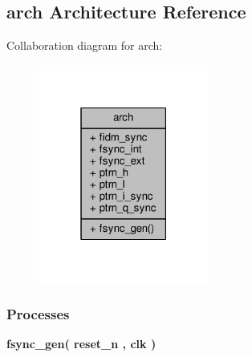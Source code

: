 \subsection{arch Architecture Reference}
\label{classtxiq__tst__ptrn_1_1arch}


Collaboration diagram for arch\+:\nopagebreak
\begin{figure}[H]
\begin{center}
\leavevmode
\includegraphics[width=159pt]{d0/da1/classtxiq__tst__ptrn_1_1arch__coll__graph}
\end{center}
\end{figure}
\subsubsection*{Processes}
 \begin{DoxyCompactItemize}
\item 
{\bf fsync\+\_\+gen}{\bfseries  ( {\bfseries {\bfseries {\bf reset\+\_\+n}} \textcolor{vhdlchar}{ }} , {\bfseries {\bfseries {\bf clk}} \textcolor{vhdlchar}{ }} )}
\end{DoxyCompactItemize}
